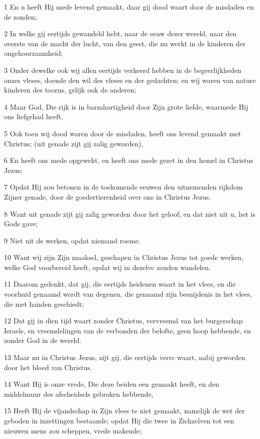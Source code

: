 \par 1 En u heeft Hij mede levend gemaakt, daar gij dood waart door de misdaden en de zonden;
\par 2 In welke gij eertijds gewandeld hebt, naar de eeuw dezer wereld, naar den overste van de macht der lucht, van den geest, die nu werkt in de kinderen der ongehoorzaamheid;
\par 3 Onder dewelke ook wij allen eertijds verkeerd hebben in de begeerlijkheden onzes vleses, doende den wil des vleses en der gedachten; en wij waren van nature kinderen des toorns, gelijk ook de anderen;
\par 4 Maar God, Die rijk is in barmhartigheid door Zijn grote liefde, waarmede Hij ons liefgehad heeft,
\par 5 Ook toen wij dood waren door de misdaden, heeft ons levend gemaakt met Christus; (uit genade zijt gij zalig geworden),
\par 6 En heeft ons mede opgewekt, en heeft ons mede gezet in den hemel in Christus Jezus;
\par 7 Opdat Hij zou betonen in de toekomende eeuwen den uitnemenden rijkdom Zijner genade, door de goedertierenheid over ons in Christus Jezus.
\par 8 Want uit genade zijt gij zalig geworden door het geloof; en dat niet uit u, het is Gods gave;
\par 9 Niet uit de werken, opdat niemand roeme.
\par 10 Want wij zijn Zijn maaksel, geschapen in Christus Jezus tot goede werken, welke God voorbereid heeft, opdat wij in dezelve zouden wandelen.
\par 11 Daarom gedenkt, dat gij, die eertijds heidenen waart in het vlees, en die voorhuid genaamd werdt van degenen, die genaamd zijn besnijdenis in het vlees, die met handen geschiedt;
\par 12 Dat gij in dien tijd waart zonder Christus, vervreemd van het burgerschap Israels, en vreemdelingen van de verbonden der belofte, geen hoop hebbende, en zonder God in de wereld.
\par 13 Maar nu in Christus Jezus, zijt gij, die eertijds verre waart, nabij geworden door het bloed van Christus.
\par 14 Want Hij is onze vrede, Die deze beiden een gemaakt heeft, en den middelmuur des afscheidsels gebroken hebbende,
\par 15 Heeft Hij de vijandschap in Zijn vlees te niet gemaakt, namelijk de wet der geboden in inzettingen bestaande; opdat Hij die twee in Zichzelven tot een nieuwen mens zou scheppen, vrede makende;
